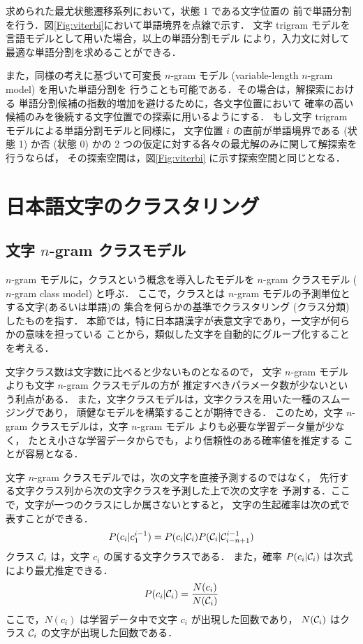 求められた最尤状態遷移系列において，状態 1 である文字位置の
前で単語分割を行う．図\ref{Fig:viterbi}において単語境界を点線で示す．
文字 trigram モデルを言語モデルとして用いた場合，以上の単語分割モデル
により，入力文に対して最適な単語分割を求めることができる．

また，同様の考えに基づいて可変長 $n$-gram モデル
(variable-length $n$-gram model) を用いた単語分割を
行うことも可能である\cite{Oda99a,Oda99b}．その場合は，解探索における
単語分割候補の指数的増加を避けるために，各文字位置において
確率の高い候補のみを後続する文字位置での探索に用いるようにする．
もし文字 trigram モデルによる単語分割モデルと同様に，
文字位置 $i$ の直前が単語境界である (状態 1) か否 (状態 0) かの
2 つの仮定に対する各々の最尤解のみに関して解探索を行うならば，
その探索空間は，図\ref{Fig:viterbi} に示す探索空間と同じとなる．

\section{日本語文字のクラスタリング}
\label{Sec:CharClustering}

\subsection{文字 $n$-gram クラスモデル}

$n$-gram モデルに，クラスという概念を導入したモデルを
$n$-gram クラスモデル ($n$-gram class model) と呼ぶ\cite{Brown92}．
ここで，クラスとは $n$-gram モデルの予測単位とする文字(あるいは単語)の
集合を何らかの基準でクラスタリング (クラス分類) したものを指す．
本節では，特に日本語漢字が表意文字であり，一文字が何らかの意味を担っている
ことから，類似した文字を自動的にグループ化することを考える．

文字クラス数は文字数に比べると少ないものとなるので，
文字 $n$-gram モデルよりも文字 $n$-gram クラスモデルの方が
推定すべきパラメータ数が少ないという利点がある．
また，文字クラスモデルは，文字クラスを用いた一種のスムージングであり，
頑健なモデルを構築することが期待できる．
このため，文字 $n$-gram クラスモデルは，文字 $n$-gram モデル
よりも必要な学習データ量が少なく，
たとえ小さな学習データからでも，より信頼性のある確率値を推定する
ことが容易となる．

文字 $n$-gram クラスモデルでは，次の文字を直接予測するのではなく，
先行する文字クラス列から次の文字クラスを予測した上で次の文字を
予測する．ここで，文字が一つのクラスにしか属さないとすると，
文字の生起確率は次の式で表すことができる．
\begin{equation}
P(c_i|c_1^{i-1}) = P(c_i|{\cal C}_i)P({\cal C}_i|{\cal C}_{i-n+1}^{i-1})
\label{Eq:CharClassModel}
\end{equation}
クラス ${\cal C}_i$ は，文字 $c_i$ の属する文字クラスである．
また，確率 $P(c_i|{\cal C}_i)$ は次式により最尤推定できる．
\begin{equation}
P(c_i|{\cal C}_i) = \frac{N(c_i)}{N({\cal C}_i)}
\label{Eq:CharClassProb}
\end{equation}
ここで，$N(c_i)$ は学習データ中で文字 $c_i$ が出現した回数であり，
$N({\cal C}_i)$ はクラス ${\cal C}_i$ の文字が出現した回数である．


